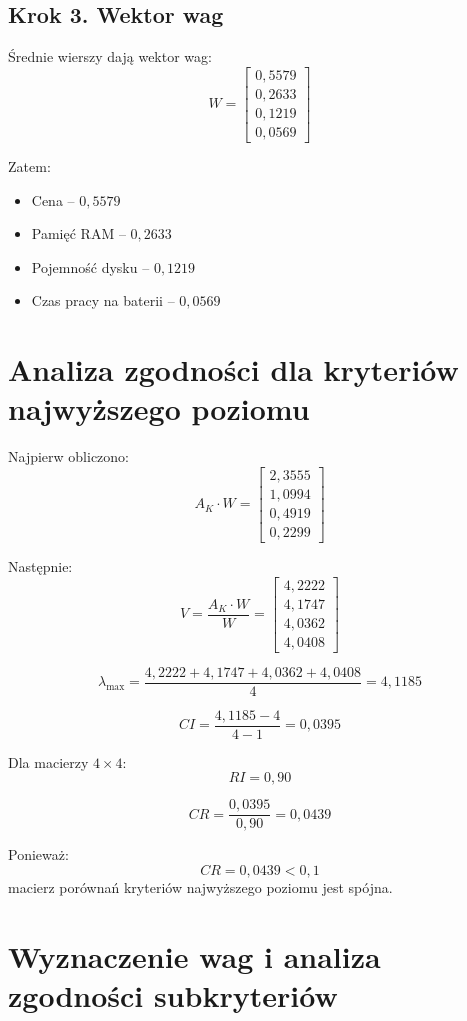 \documentclass[12pt,a4paper]{article}
\begin{document}
\subsection*{Krok 3. Wektor wag}

Średnie wierszy dają wektor wag:
\[
W=
\begin{bmatrix}
0{,}5579\\
0{,}2633\\
0{,}1219\\
0{,}0569
\end{bmatrix}
\]

Zatem:
\begin{itemize}
    \item Cena -- \(0{,}5579\)
    \item Pamięć RAM -- \(0{,}2633\)
    \item Pojemność dysku -- \(0{,}1219\)
    \item Czas pracy na baterii -- \(0{,}0569\)
\end{itemize}

\section{Analiza zgodności dla kryteriów najwyższego poziomu}

Najpierw obliczono:
\[
A_K \cdot W =
\begin{bmatrix}
2{,}3555\\
1{,}0994\\
0{,}4919\\
0{,}2299
\end{bmatrix}
\]

Następnie:
\[
V=
\frac{A_K \cdot W}{W}
=
\begin{bmatrix}
4{,}2222\\
4{,}1747\\
4{,}0362\\
4{,}0408
\end{bmatrix}
\]

\[
\lambda_{\max}=\frac{4{,}2222+4{,}1747+4{,}0362+4{,}0408}{4}=4{,}1185
\]

\[
CI=\frac{4{,}1185-4}{4-1}=0{,}0395
\]

Dla macierzy \(4\times 4\):
\[
RI=0{,}90
\]

\[
CR=\frac{0{,}0395}{0{,}90}=0{,}0439
\]

Ponieważ:
\[
CR=0{,}0439<0{,}1
\]
macierz porównań kryteriów najwyższego poziomu jest spójna.

\section{Wyznaczenie wag i analiza zgodności subkryteriów}
\end{document}
